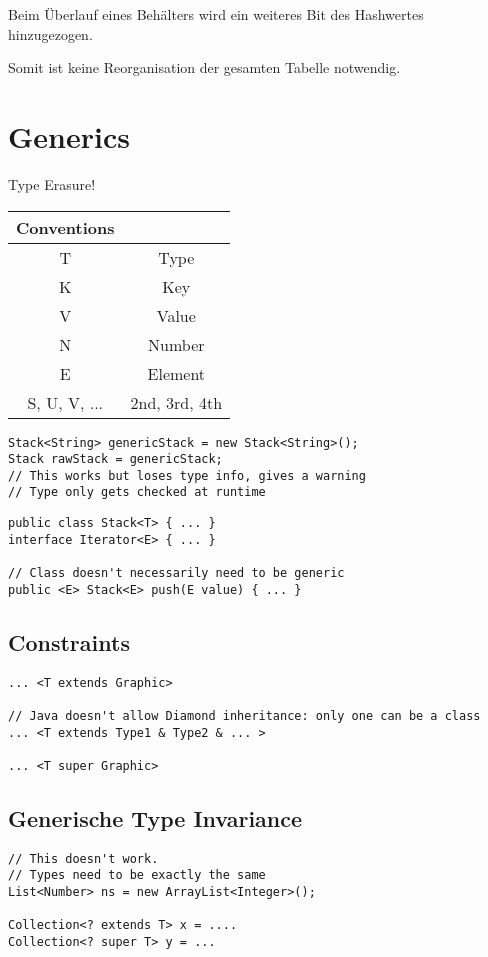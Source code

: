 \begin{multicols*}{4}
		Beim Überlauf eines Behälters wird ein weiteres Bit des Hashwertes hinzugezogen.
		
		Somit ist keine Reorganisation der gesamten Tabelle notwendig.

\section{Generics}
Type Erasure!

	\begin{tabular}{c | c}
		\textbf{Conventions} &  \\
		\hline
		T & Type \\
		K & Key \\
		V & Value \\
		N & Number \\
		E & Element \\
		S, U, V, ... & 2nd, 3rd, 4th \\
	\end{tabular}

	\begin{lstlisting}
Stack<String> genericStack = new Stack<String>();
Stack rawStack = genericStack;
// This works but loses type info, gives a warning
// Type only gets checked at runtime
	\end{lstlisting}

\vspace{5pt}

	\begin{lstlisting}
public class Stack<T> { ... }
interface Iterator<E> { ... }

// Class doesn't necessarily need to be generic
public <E> Stack<E> push(E value) { ... }
	\end{lstlisting}

	\subsection{Constraints}
		\begin{lstlisting}
... <T extends Graphic>

// Java doesn't allow Diamond inheritance: only one can be a class
... <T extends Type1 & Type2 & ... >

... <T super Graphic>
		\end{lstlisting}
	
	\subsection{Generische Type Invariance}
		\begin{lstlisting}
// This doesn't work. 
// Types need to be exactly the same
List<Number> ns = new ArrayList<Integer>();

Collection<? extends T> x = ....
Collection<? super T> y = ...
		\end{lstlisting}


\end{multicols*}

% 

